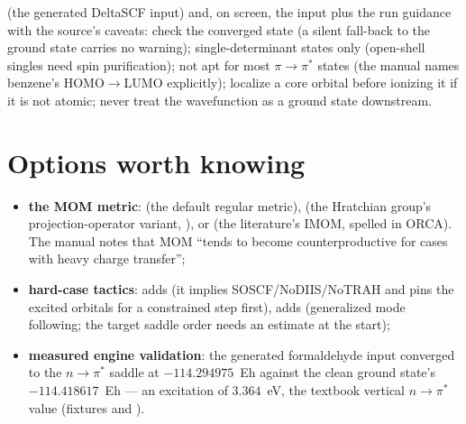  (the generated DeltaSCF input) and, on screen, the
input plus the run guidance with the source's caveats: check the converged
state (a silent fall-back to the ground state carries no warning);
single-determinant states only (open-shell singles need spin purification);
not apt for most $\pi\to\pi^{*}$ states (the manual names benzene's
HOMO$\to$LUMO explicitly); localize a core orbital before ionizing it if it
is not atomic; never treat the wavefunction as a ground state downstream.

\section{Options worth knowing}

\begin{readbox}
\begin{itemize}
  \item \textbf{the MOM metric}:  (the default regular metric),
     (the Hratchian group's projection-operator variant,
    ), or  (the literature's IMOM, spelled
     in ORCA).  The manual notes that MOM ``tends to
    become counterproductive for cases with heavy charge transfer'';
  \item \textbf{hard-case tactics}:  adds
     (it implies SOSCF/NoDIIS/NoTRAH and pins the
    excited orbitals for a constrained step first),  adds
     (generalized mode following; the target saddle order needs an
    estimate at the start);
  \item \textbf{measured engine validation}: the generated formaldehyde input
    converged to the $n\to\pi^{*}$ saddle at $-114.294975$~Eh against the
    clean ground state's $-114.418617$~Eh --- an excitation of
    $3.364$~eV, the textbook vertical $n\to\pi^{*}$ value (fixtures
     and ).
\end{itemize}
\end{readbox}
